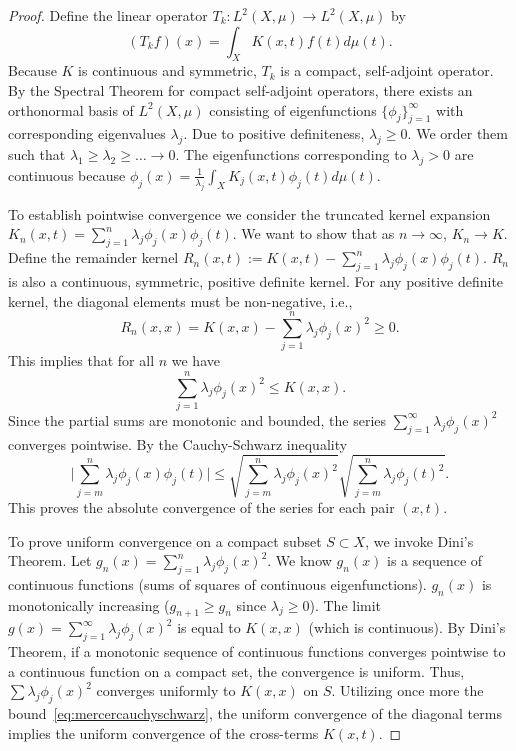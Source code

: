 \begin{proof}
Define the linear operator $T_k: L^2(X, \mu) \to L^2(X, \mu)$ by
$$(T_k f)(x) = \int_X K(x, t) f(t) d\mu(t).$$
Because $K$ is continuous and symmetric, $T_k$ is a compact, self-adjoint operator. By the Spectral Theorem for compact self-adjoint operators, there exists an orthonormal basis of $L^2(X, \mu)$ consisting of eigenfunctions $\{\phi_j\}_{j=1}^\infty$ with corresponding eigenvalues $\lambda_j$.
Due to positive definiteness, $\lambda_j \ge 0$.
We order them such that $\lambda_1 \ge \lambda_2 \ge \dots \to 0$.
The eigenfunctions corresponding to $\lambda_j > 0$ are continuous because $\phi_j(x) = \frac{1}{\lambda_j} \int_X K_j(x, t) \phi_j(t) d\mu(t)$.

To establish pointwise convergence we 
consider the truncated kernel expansion $K_n(x, t) = \sum_{j=1}^n \lambda_j \phi_j(x) \phi_j(t)$. We want to show that as $n \to \infty$, $K_n \to K$.
Define the remainder kernel $R_n(x, t) := K(x, t) - \sum_{j=1}^n \lambda_j \phi_j(x) \phi_j(t)$.
$R_n$ is also a continuous, symmetric, positive definite kernel. For any positive definite kernel, the diagonal elements must be non-negative, i.e.,
$$R_n(x, x) = K(x, x) - \sum_{j=1}^n \lambda_j \phi_j(x)^2 \ge 0.$$
This implies that for all $n$ we have
$$\sum_{j=1}^n \lambda_j \phi_j(x)^2 \le K(x, x).$$
Since the partial sums are monotonic and bounded, the series $\sum_{j=1}^\infty \lambda_j \phi_j(x)^2$ converges pointwise. By the Cauchy-Schwarz inequality
\begin{equation}\label{eq:mercercauchyschwarz}
\Big| \sum_{j=m}^n \lambda_j \phi_j(x) \phi_j(t) \Big| \le \sqrt{\sum_{j=m}^n \lambda_j \phi_j(x)^2} \sqrt{\sum_{j=m}^n \lambda_j \phi_j(t)^2}.
\end{equation}
This proves the absolute convergence of the series for each pair $(x, t)$.

To prove uniform convergence on a compact subset $S \subset X$, we invoke Dini's Theorem.
Let $g_n(x) = \sum_{j=1}^n \lambda_j \phi_j(x)^2$. We know $g_n(x)$ is a sequence of continuous functions (sums of squares of continuous eigenfunctions).
$g_n(x)$ is monotonically increasing ($g_{n+1} \ge g_n$ since $\lambda_j \ge 0$).
The limit $g(x) = \sum_{j=1}^\infty \lambda_j \phi_j(x)^2$ is equal to $K(x, x)$ (which is continuous).
By Dini's Theorem, if a monotonic sequence of continuous functions converges pointwise to a continuous function on a compact set, the convergence is uniform. Thus, $\sum \lambda_j \phi_j(x)^2$ converges uniformly to $K(x, x)$ on $S$. Utilizing once more the bound~\eqref{eq:mercercauchyschwarz}, the uniform convergence of the diagonal terms implies the uniform convergence of the cross-terms $K(x, t)$.


\end{proof}
